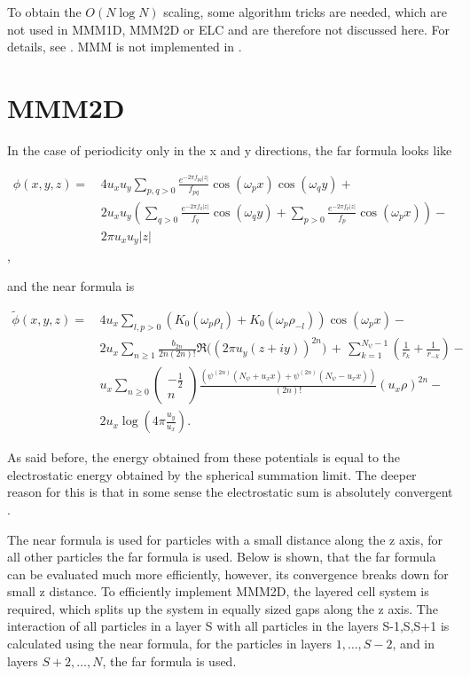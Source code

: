 To obtain the $O(N\log N)$ scaling, some algorithm tricks are needed,
which are not used in MMM1D, MMM2D or ELC and are therefore not
discussed here. For details, see \citet{strebel99a}. MMM is not
implemented in \es.

\section{MMM2D}

In the case of periodicity only in the x and y directions, the far
formula looks like

\[ \begin{array}{rl} \phi(x,y,z) = \, & 4 u_x u_y\sum_{p,q>0}
  \frac{e^{-2\pi f_{pq}|z|}} {f_{pq}} \cos(\omega_p x)\cos(\omega_q y)
  +\\ & 2 u_x u_y\left(\sum_{q>0} \frac{e^{-2\pi f_q|z|}}{f_q}
    \cos(\omega_q y) + \sum_{p>0} \frac{e^{-2\pi f_p|z|}}{f_p}
    \cos(\omega_p x)\right) -\\ & 2\pi u_x u_y |z| \end{array} \],

and the near formula is

\[ \begin{array}{rl} \tilde\phi(x,y,z)=\, &
  4u_x\sum_{l,p>0}\left(K_0(\omega_p\rho_l) +
    K_0(\omega_p\rho_{-l})\right)\cos(\omega_p x) -\\ & 2u_x\sum_{n\ge
    1}\frac{b_{2n}}{2n(2n)!} \Re\bigl((2\pi u_y
  (z+iy))^{2n}\bigr)\,+\, \sum_{k=1}^{N_\psi-1}\left(\frac{1}{r_{k}} +
    \frac{1}{r_{-k}}\right) -\\ & u_x\sum_{n\ge
    0}\left(\begin{array}{c}-\frac{1}{2}\\n\end{array}\right)\frac{\left(
      \psi^{(2n)}(N_\psi + u_x x) + \psi^{(2n)}(N_\psi - u_x
      x)\right)}{(2n)!}(u_x\rho)^{2n} -\\ &
  2u_x\log\left(4\pi\frac{u_y}{u_x}\right). \end{array} \]

As said before, the energy obtained from these potentials is equal to
the electrostatic energy obtained by the spherical summation limit.
The deeper reason for this is that in some sense the electrostatic sum
is absolutely convergent \citep{arnold02a}.

The near formula is used for particles with a small distance along the
z axis, for all other particles the far formula is used. Below is
shown, that the far formula can be evaluated much more efficiently,
however, its convergence breaks down for small z distance. To
efficiently implement MMM2D, the layered cell system is required,
which splits up the system in equally sized gaps along the z axis. The
interaction of all particles in a layer S with all particles in the
layers S-1,S,S+1 is calculated using the near formula, for the
particles in layers $1,\dots,S-2$, and in layers $S+2,\dots,N$, the
far formula is used.

